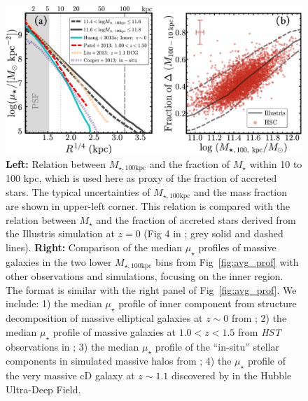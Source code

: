 \documentclass[a4paper,fleqn,usenatbib]{mnras}
\def\mstar{{$M_{\star}$}}
\def\mtot{{$M_{\star,100\mathrm{kpc}}$}}
\def\mden{{$\mu_{\star}$}}
\begin{document}
  \begin{figure}
      \centering 
      \includegraphics[width=\textwidth]{fig/redbcg_insitu_accretion}
      \caption{
          \textbf{Left:}
          Relation between \mtot{} and the fraction of \mstar{} within 10 to 100 kpc, 
          which is used here as proxy of the fraction of accreted stars. 
          The typical uncertainties of \mtot{} and the mass fraction are shown in 
          upper-left corner. 
          This relation is compared with the relation between \mstar{} and the fraction
          of accreted stars derived from the Illustris simulation at $z=0$ 
          (Fig 4 in \citealt{RodriguezGomez2016}; grey solid and dashed lines). 
          \textbf{Right:}
          Comparison of the median \mden{} profiles of massive galaxies in the 
          two lower \mtot{} bins from Fig~\ref{fig:avg_prof} with other observations 
          and simulations, focusing on the inner region. 
          The format is similar with the right panel of Fig~\ref{fig:avg_prof}.
          We include: 
          1) the median \mden{} profile of inner component from structure 
          decomposition of massive elliptical galaxies at $z{\sim} 0$ from 
          \citet[][Cyan, solid]{Huang2013a}; 
          2) the median \mden{} profile of massive galaxies at $1.0 < z < 1.5$ 
          from \textit{HST} observations in \citet[][Red, dashed]{Patel2013}; 
          3) the median \mden{} profile of the ``in-situ'' stellar components in 
          simulated massive halos from \citet[][Purple, dot-dashed]{Cooper2013};
          4) the \mden{} profile of the very massive cD galaxy at $z{\sim} 1.1$ 
          discovered by \citet[][Yellow, dashed]{Liu2013} in the Hubble 
          Ultra-Deep Field.
          }
      \label{fig:discussion_1}
  \end{figure}
\end{document}
